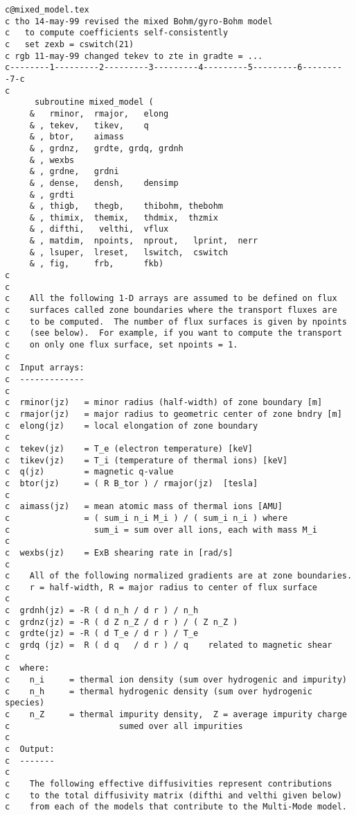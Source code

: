 \begin{verbatim}
c@mixed_model.tex
c tho 14-may-99 revised the mixed Bohm/gyro-Bohm model
c   to compute coefficients self-consistently
c   set zexb = cswitch(21)
c rgb 11-may-99 changed tekev to zte in gradte = ...
c--------1---------2---------3---------4---------5---------6---------7-c
c
      subroutine mixed_model (
     &   rminor,  rmajor,   elong
     & , tekev,   tikev,    q       
     & , btor,    aimass
     & , grdnz,   grdte, grdq, grdnh
     & , wexbs
     & , grdne,   grdni
     & , dense,   densh,    densimp     
     & , grdti  
     & , thigb,   thegb,    thibohm, thebohm
     & , thimix,  themix,   thdmix,  thzmix
     & , difthi,   velthi,  vflux
     & , matdim,  npoints,  nprout,   lprint,  nerr
     & , lsuper,  lreset,   lswitch,  cswitch
     & , fig,     frb,      fkb)
c
c
c    All the following 1-D arrays are assumed to be defined on flux
c    surfaces called zone boundaries where the transport fluxes are
c    to be computed.  The number of flux surfaces is given by npoints
c    (see below).  For example, if you want to compute the transport
c    on only one flux surface, set npoints = 1.
c
c  Input arrays:
c  -------------
c
c  rminor(jz)   = minor radius (half-width) of zone boundary [m]
c  rmajor(jz)   = major radius to geometric center of zone bndry [m]
c  elong(jz)    = local elongation of zone boundary
c
c  tekev(jz)    = T_e (electron temperature) [keV] 
c  tikev(jz)    = T_i (temperature of thermal ions) [keV]
c  q(jz)        = magnetic q-value
c  btor(jz)     = ( R B_tor ) / rmajor(jz)  [tesla]
c
c  aimass(jz)   = mean atomic mass of thermal ions [AMU]
c               = ( sum_i n_i M_i ) / ( sum_i n_i ) where
c                 sum_i = sum over all ions, each with mass M_i
c
c  wexbs(jz)    = ExB shearing rate in [rad/s]
c
c    All of the following normalized gradients are at zone boundaries.
c    r = half-width, R = major radius to center of flux surface
c
c  grdnh(jz) = -R ( d n_h / d r ) / n_h
c  grdnz(jz) = -R ( d Z n_Z / d r ) / ( Z n_Z )
c  grdte(jz) = -R ( d T_e / d r ) / T_e
c  grdq (jz) =  R ( d q   / d r ) / q    related to magnetic shear
c
c  where:
c    n_i     = thermal ion density (sum over hydrogenic and impurity)
c    n_h     = thermal hydrogenic density (sum over hydrogenic species)
c    n_Z     = thermal impurity density,  Z = average impurity charge
c                      sumed over all impurities
c
c  Output:
c  -------
c
c    The following effective diffusivities represent contributions
c    to the total diffusivity matrix (difthi and velthi given below)
c    from each of the models that contribute to the Multi-Mode model.

\end{verbatim}
